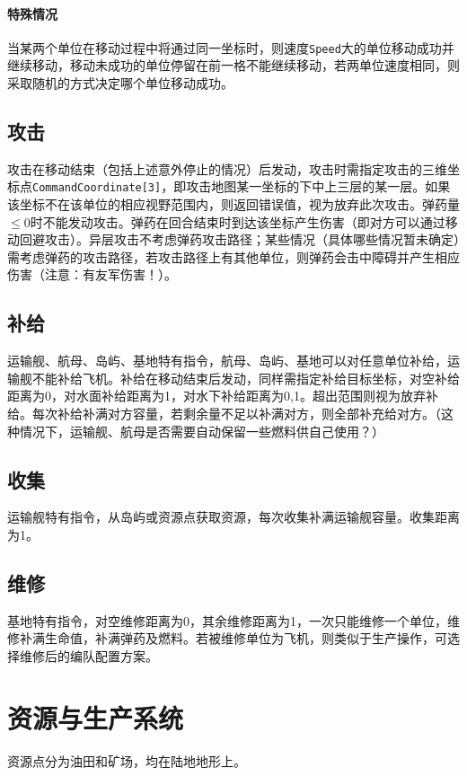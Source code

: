 \documentclass[11pt,a4paper]{article}
\begin{document}
      \paragraph{特殊情况}
      当某两个单位在移动过程中将通过同一坐标时，则速度\texttt{Speed}大的单位移动成功并继续移动，移动未成功的单位停留在前一格不能继续移动，若两单位速度相同，则采取随机的方式决定哪个单位移动成功。

    \subsection{攻击}
      攻击在移动结束（包括上述意外停止的情况）后发动，攻击时需指定攻击的三维坐标点\texttt{CommandCoordinate[3]}，即攻击地图某一坐标的下中上三层的某一层。如果该坐标不在该单位的相应视野范围内，则返回错误值，视为放弃此次攻击。弹药量$\leq 0$时不能发动攻击。弹药在回合结束时到达该坐标产生伤害（即对方可以通过移动回避攻击）。异层攻击不考虑弹药攻击路径；某些情况（具体哪些情况暂未确定）需考虑弹药的攻击路径，若攻击路径上有其他单位，则弹药会击中障碍并产生相应伤害（注意：有友军伤害！）。

    \subsection{补给}
      运输舰、航母、岛屿、基地特有指令，航母、岛屿、基地可以对任意单位补给，运输舰不能补给飞机。补给在移动结束后发动，同样需指定补给目标坐标，对空补给距离为0，对水面补给距离为1，对水下补给距离为0,1。超出范围则视为放弃补给。每次补给补满对方容量，若剩余量不足以补满对方，则全部补充给对方。（这种情况下，运输舰、航母是否需要自动保留一些燃料供自己使用？）

    \subsection{收集}
      运输舰特有指令，从岛屿或资源点获取资源，每次收集补满运输舰容量。收集距离为1。

    \subsection{维修}
      基地特有指令，对空维修距离为0，其余维修距离为1，一次只能维修一个单位，维修补满生命值，补满弹药及燃料。若被维修单位为飞机，则类似于生产操作，可选择维修后的编队配置方案。


  \section{资源与生产系统}
    资源点分为油田和矿场，均在陆地地形上。
\end{document}
